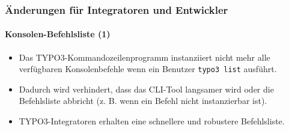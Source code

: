 %

\begin{frame}[fragile]
	\frametitle{Änderungen für Integratoren und Entwickler}
	\framesubtitle{Konsolen-Befehlsliste (1)}

	\begin{itemize}
		\item Das TYPO3-Kommandozeilenprogramm instanziiert nicht mehr alle
			verfügbaren Konsolenbefehle wenn ein Benutzer \texttt{typo3 list} ausführt.
		\item Dadurch wird verhindert, dass das CLI-Tool langsamer wird 
			oder die Befehlsliste abbricht (z. B. wenn ein Befehl nicht instanzierbar ist).
		\item TYPO3-Integratoren erhalten eine schnellere und robustere Befehlsliste.
	\end{itemize}

\end{frame}


